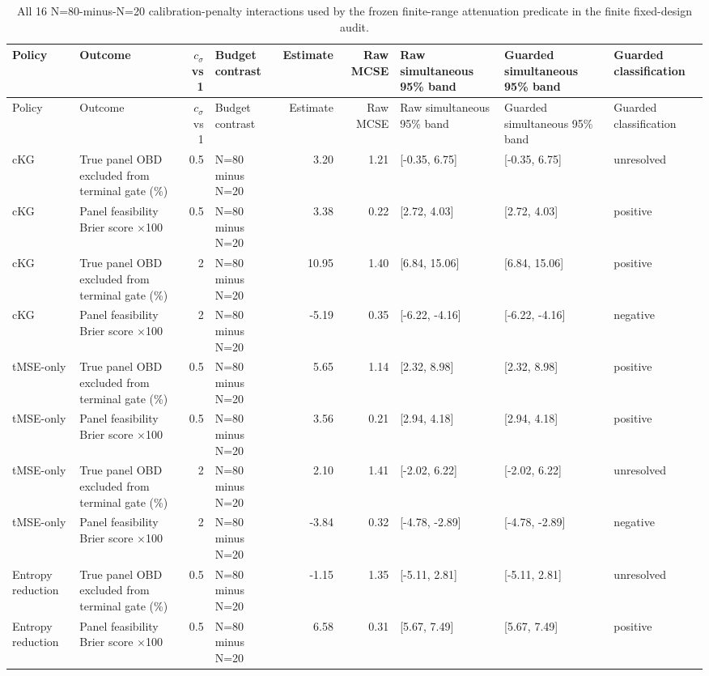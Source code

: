 \begin{longtable}{p{1.8cm}p{3.0cm}rp{2.0cm}rrp{2.6cm}p{2.6cm}p{1.6cm}}
\caption{All 16 N=80-minus-N=20 calibration-penalty interactions used by the frozen finite-range attenuation predicate in the finite fixed-design audit.}\label{tab:budget-toxicity-calibration-family-c}\\
\toprule
Policy & Outcome & $c_\sigma$ vs 1 & Budget contrast & Estimate & Raw MCSE & Raw simultaneous 95\% band & Guarded simultaneous 95\% band & Guarded classification \\
\midrule
\endfirsthead
\toprule
Policy & Outcome & $c_\sigma$ vs 1 & Budget contrast & Estimate & Raw MCSE & Raw simultaneous 95\% band & Guarded simultaneous 95\% band & Guarded classification \\
\midrule
\endhead
cKG & True panel OBD excluded from terminal gate (\%) & 0.5 & N=80 minus N=20 & 3.20 & 1.21 & [-0.35, 6.75] & [-0.35, 6.75] & unresolved \\
cKG & Panel feasibility Brier score $\times$100 & 0.5 & N=80 minus N=20 & 3.38 & 0.22 & [2.72, 4.03] & [2.72, 4.03] & positive \\
cKG & True panel OBD excluded from terminal gate (\%) & 2 & N=80 minus N=20 & 10.95 & 1.40 & [6.84, 15.06] & [6.84, 15.06] & positive \\
cKG & Panel feasibility Brier score $\times$100 & 2 & N=80 minus N=20 & -5.19 & 0.35 & [-6.22, -4.16] & [-6.22, -4.16] & negative \\
tMSE-only & True panel OBD excluded from terminal gate (\%) & 0.5 & N=80 minus N=20 & 5.65 & 1.14 & [2.32, 8.98] & [2.32, 8.98] & positive \\
tMSE-only & Panel feasibility Brier score $\times$100 & 0.5 & N=80 minus N=20 & 3.56 & 0.21 & [2.94, 4.18] & [2.94, 4.18] & positive \\
tMSE-only & True panel OBD excluded from terminal gate (\%) & 2 & N=80 minus N=20 & 2.10 & 1.41 & [-2.02, 6.22] & [-2.02, 6.22] & unresolved \\
tMSE-only & Panel feasibility Brier score $\times$100 & 2 & N=80 minus N=20 & -3.84 & 0.32 & [-4.78, -2.89] & [-4.78, -2.89] & negative \\
Entropy reduction & True panel OBD excluded from terminal gate (\%) & 0.5 & N=80 minus N=20 & -1.15 & 1.35 & [-5.11, 2.81] & [-5.11, 2.81] & unresolved \\
Entropy reduction & Panel feasibility Brier score $\times$100 & 0.5 & N=80 minus N=20 & 6.58 & 0.31 & [5.67, 7.49] & [5.67, 7.49] & positive \\

\end{longtable}
